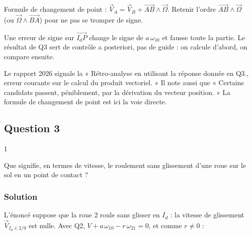 \documentclass[11pt,a4paper]{article}
\newcommand{\equationajustee}[1]{%
  \sbox{\boiteequation}{$\displaystyle #1$}%
  \ifdim\wd\boiteequation>\linewidth
    \[\resizebox{\linewidth}{!}{\usebox{\boiteequation}}\]%
  \else
    \[#1\]%
  \fi}
\begin{document}
\equationajustee{\boxed{\vec V_{I_d\in 2/0} = \left(V + a\,\omega_{10} - r\,\omega_{21}\right)\vec x_1}}

\begin{methode}

Formule de changement de point : \(\vec V_{A} = \vec V_{B} + \overrightarrow{AB}\wedge\vec\Omega\). Retenir l'ordre \(\overrightarrow{AB}\wedge\vec\Omega\) (ou \(\vec\Omega\wedge\overrightarrow{BA}\)) pour ne pas se tromper de signe.

\end{methode}

\begin{piege}

Une erreur de signe sur \(\overrightarrow{I_dP}\) change le signe de \(a\,\omega_{10}\) et fausse toute la partie. Le résultat de Q3 sert de contrôle a posteriori, pas de guide : on calcule d'abord, on compare ensuite.

\end{piege}

\begin{jury}

Le rapport 2026 signale la « Rétro-analyse en utilisant la réponse donnée en Q3., erreur courante sur le calcul du produit vectoriel. » Il note aussi que « Certains candidats passent, péniblement, par la dérivation du vecteur position. » La formule de changement de point est ici la voie directe.

\end{jury}

\hypertarget{question-3}{%
\subsection{Question 3}\label{question-3}}

\begin{indication}{1}

Que signifie, en termes de vitesse, le roulement sans glissement d'une roue sur le sol en un point de contact ?

\end{indication}

\hypertarget{solution-2}{%
\subsubsection{Solution}\label{solution-2}}

L'énoncé suppose que la roue 2 roule sans glisser en \(I_d\) : la vitesse de glissement \(\vec V_{I_d\in 2/0}\) est nulle. Avec Q2, \(V + a\,\omega_{10} - r\,\omega_{21} = 0\), et comme \(r \neq 0\) :
\end{document}
